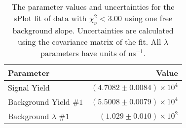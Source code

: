 
\begin{table}[ht]
    \begin{center}
        \begin{tabular}{lr}\toprule
            Parameter & Value \\\midrule
            Signal Yield & $(4.7082 \pm 0.0084) \times 10^{4}$ \\
            Background Yield $\#1$ & $(5.5008 \pm 0.0079) \times 10^{4}$ \\
            Background $\lambda$ $\#1$ & $(1.029 \pm 0.010) \times 10^{2}$ \\\bottomrule
        \end{tabular}
        \caption{The parameter values and uncertainties for the sPlot fit of data with $\chi^2_\nu < 3.00$ using one free background slope. Uncertainties are calculated using the covariance matrix of the fit. All $\lambda$ parameters have units of $\si{\nano\second}^{-1}$.}\label{tab:splot-fit-results-chisqdof-3.00-free-1}
    \end{center}
\end{table}
